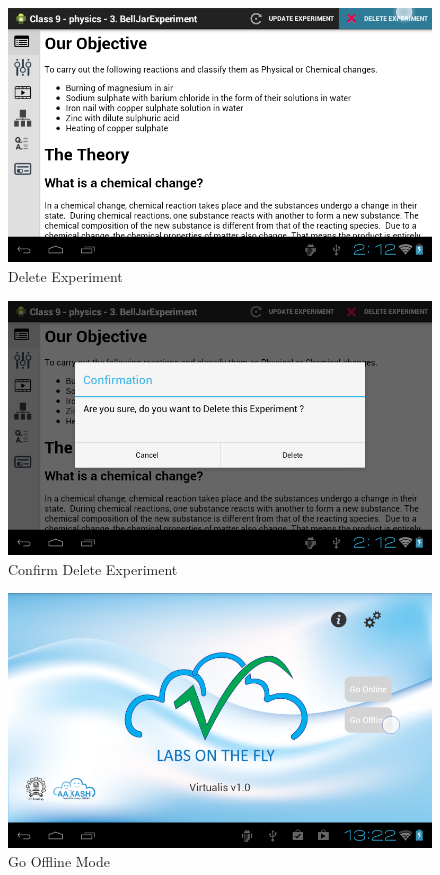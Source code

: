 \documentclass[12pt]{report}
\begin{document}
\begin{figure}[H]
 \centering
 \includegraphics[width=15cm]{./35.png}
 \caption{Delete Experiment\label{fig:35}}
\end{figure}

\begin{figure}[H]
 \centering
 \includegraphics[width=15cm]{./36.png}
 \caption{Confirm Delete Experiment \label{fig:36}}
\end{figure}

\begin{figure}[H]
 \centering
 \includegraphics[width=15cm]{./38.png}
 \caption{Go Offline Mode\label{fig:38}}
\end{figure}
\end{document}
